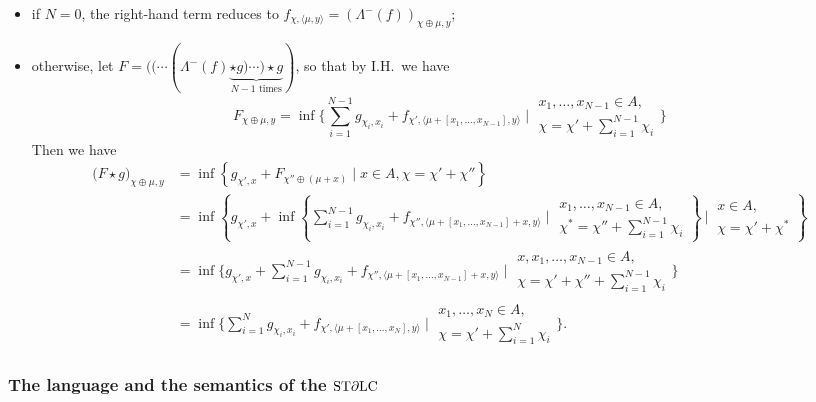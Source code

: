 \begin{itemize}

\item if $N=0$, the right-hand term reduces to 
$f_{\chi, \langle \mu, y\rangle}=(\Lambda^{-}(f))_{\chi\oplus\mu,y}$;

\item otherwise, let $F=(( \cdots (\Lambda^{-}(f) \underbrace{\star g)\cdots )\star g}_{N-1\text{ times}})$, so that by I.H.~we have
$$
F_{\chi\oplus\mu,y}=
\inf\Big \{ 
\sum_{i=1}^{N-1}g_{\chi_{i},x_{i}}+
f_{\chi', \langle\mu+ [x_{1},\dots, x_{N-1}],y\rangle}
\mid 
\begin{matrix}
x_{1},\dots, x_{N-1}\in A,\\
\chi= \chi'+\sum_{i=1}^{N-1}\chi_{i}
\end{matrix}
\Big \}
$$
Then we have
{\small
\begin{align*}
\big( F\star g\big)_{\chi\oplus\mu,y}
&=
\inf \left \{
g_{\chi',x}+F_{\chi''\oplus(\mu+x)}
\mid
x\in A, \chi=\chi'+\chi''
\right\}\\
&=
\inf\left \{ 
g_{\chi',x}+
\inf\left\{
\sum_{i=1}^{N-1}g_{\chi_{i},x_{i}}+
f_{\chi'', \langle\mu+ [x_{1},\dots, x_{N-1}]+x,y\rangle}
\mid 
\begin{matrix}
x_{1},\dots, x_{N-1}\in A,\\
\chi^{*}= \chi''+\sum_{i=1}^{N-1}\chi_{i}
\end{matrix}
\right\}
\ 
\Big\vert \ 
\begin{matrix}
x\in A,\\
\chi=\chi'+\chi^{*}
\end{matrix}
\right \}\\
&=
\inf\Big \{ 
g_{\chi',x}+
\sum_{i=1}^{N-1}g_{\chi_{i},x_{i}}+
f_{\chi'', \langle\mu+ [x_{1},\dots, x_{N-1}]+x,y\rangle}
\mid 
\begin{matrix}
x,x_{1},\dots, x_{N-1}\in A,\\
\chi= \chi'+\chi''+\sum_{i=1}^{N-1}\chi_{i}
\end{matrix}
\Big \}\\
&=
\inf\Big \{ 
\sum_{i=1}^{N}g_{\chi_{i},x_{i}}+
f_{\chi', \langle\mu+ [x_{1},\dots, x_{N}],y\rangle}
\mid 
\begin{matrix}
x_{1},\dots, x_{N}\in A,\\
\chi= \chi'+\sum_{i=1}^{N}\chi_{i}
\end{matrix}
\Big \}.
\end{align*}
}
\end{itemize}

\subsubsection{The language and the semantics of the $\mathrm{ST}\partial\mathrm{LC}$}\label{secApp:STDLC}

